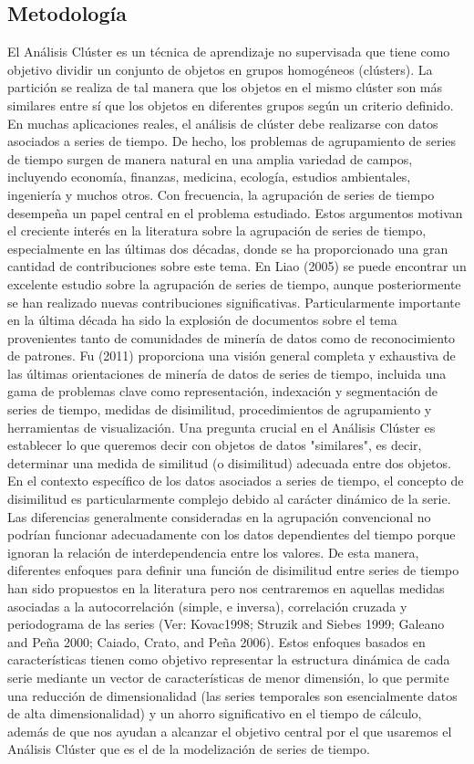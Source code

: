 \documentclass[10pt,a5paper]{article}
\begin{document}
\subsection{Metodología}
El Análisis Clúster es un técnica de aprendizaje no supervisada que tiene como objetivo dividir un conjunto de objetos en grupos homogéneos (clústers). La partición se realiza de tal manera que los objetos en el mismo clúster son más similares entre sí que los objetos en diferentes grupos según un criterio definido. En muchas aplicaciones reales, el análisis de clúster debe realizarse con datos asociados a  series de tiempo. De hecho, los problemas de agrupamiento de series de tiempo surgen de manera natural en una amplia variedad de campos, incluyendo economía, finanzas, medicina, ecología, estudios ambientales, ingeniería y muchos otros. 
Con frecuencia, la agrupación de series de tiempo desempeña un papel central en el problema estudiado. Estos argumentos motivan el creciente interés en la literatura sobre la agrupación de series de tiempo, especialmente en las últimas dos décadas, donde se ha proporcionado una gran cantidad de contribuciones sobre este tema. En Liao (2005) se puede encontrar un excelente estudio sobre la agrupación de series de tiempo, aunque posteriormente se han realizado nuevas contribuciones significativas. Particularmente importante en la última década ha sido la explosión de documentos sobre el tema provenientes tanto de comunidades de minería de datos como de reconocimiento de patrones. Fu (2011) proporciona una visión general completa y exhaustiva de las últimas orientaciones de minería de datos de series de tiempo, incluida una gama de problemas clave como representación, indexación y segmentación de series de tiempo, medidas de disimilitud, procedimientos de agrupamiento y herramientas de visualización.
Una pregunta crucial en el Análisis Clúster es establecer lo que queremos decir con objetos de datos "similares", es decir, determinar una medida de similitud (o disimilitud) adecuada entre dos objetos. En el contexto específico de los datos asociados a series de tiempo, el concepto de disimilitud es particularmente complejo debido al carácter dinámico de la serie. Las diferencias generalmente consideradas en la agrupación convencional no podrían funcionar adecuadamente con los datos dependientes del tiempo porque ignoran la relación de interdependencia entre los valores. 
De esta manera, diferentes enfoques para definir una función de disimilitud entre series de tiempo han sido propuestos en la literatura pero nos centraremos en aquellas medidas asociadas a la autocorrelación (simple, e inversa), correlación cruzada y periodograma de las series (Ver: Kovac1998; Struzik and Siebes 1999; Galeano and Peña 2000; Caiado, Crato, and Peña 2006). Estos enfoques basados en características tienen como objetivo representar la estructura dinámica de cada serie mediante un vector de características de menor dimensión, lo que permite una reducción de dimensionalidad (las series temporales son esencialmente datos de alta dimensionalidad) y un ahorro significativo en el tiempo de cálculo, además de que nos ayudan a alcanzar el objetivo central por el que usaremos el Análisis Clúster que es el de la modelización de series de tiempo.
\end{document}

